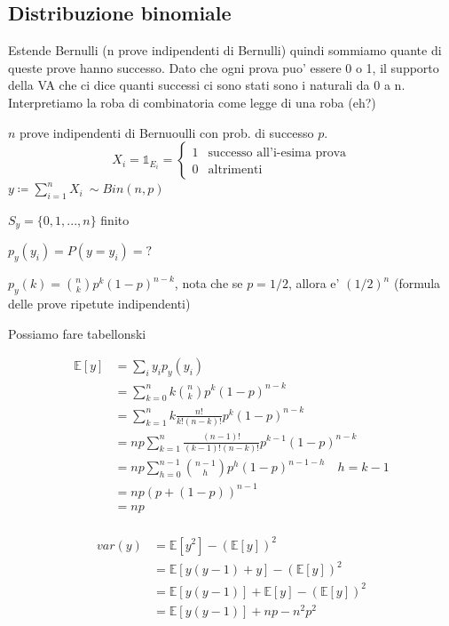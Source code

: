 \subsection{Distribuzione binomiale}
Estende Bernulli (n prove indipendenti di Bernulli) quindi sommiamo quante di queste prove hanno successo. Dato che ogni prova puo' essere 0 o 1, il supporto della VA che ci dice quanti successi ci sono stati sono i naturali da 0 a n.
Interpretiamo la roba di combinatoria come legge di una roba (eh?)

$ n $ prove indipendenti di Bernuoulli con prob. di successo $ p $.
\[
X_i = \mathbb{1}_{E_i} = \begin{cases}
1 & \text{successo all'i-esima prova}\\
0 & \text{altrimenti}
\end{cases}
\]
$ y \coloneq \sum_{i=1}^{n} X_i\ \sim Bin(n,p) $

$ S_y = \{0,1,...,n\} $ finito

$ p_y(y_i) = P(y = y_i) = ? $

$ p_y(k) = \binom{n}{k} p^{k}(1-p)^{n-k} $, nota che se $ p = 1/2 $, allora e' $ (1/2)^{n} $ (formula delle prove ripetute indipendenti)

Possiamo fare tabellonski

\begin{align*}
  \mathbb{E}[y] &= \sum_{i} y_i p_y(y_i)\\
  &= \sum_{k=0}^{n} k \binom{n}{k} p^{k}(1-p)^{n-k}  \\
  &= \sum_{k=1}^{n} k \frac{n!}{k!(n-k)!} p^{k}(1-p)^{n-k} \\
  &= np \sum_{k=1}^{n} \frac{(n-1)!}{(k-1)!(n-k)!} p^{k-1}(1-p)^{n-k} \\
  &= np \sum_{h=0}^{n-1} \binom{n-1}{h} p^{h}(1-p)^{n-1-h} \quad h = k-1 \\
  &= np (p + (1-p))^{n-1} \\
  &= np \\
\end{align*}


\begin{align*}
  var(y) &= \mathbb{E}[y^2] - (\mathbb{E}[y])^2 \\
  &= \mathbb{E}[y(y-1) + y] - (\mathbb{E}[y])^2 \\
  &= \mathbb{E}[y(y-1)] + \mathbb{E}[y] - (\mathbb{E}[y])^2 \\
  &= \mathbb{E}[y(y-1)] + np - n^2p^2 \\
\end{align*}

